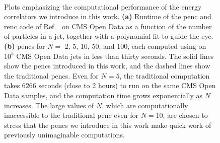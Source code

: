 \begin{figure}[t!]
    $\qquad$
    \caption[Plots emphasizing the computational performance of the new parameterization of energy correlators discussed in this work.]
    {
        Plots emphasizing the computational performance of the energy correlators we introduce in this work.
        \textbf{(a)}
        Runtime of the \gls{penc} and \gls{renc} code of Ref.~\cite{github:RENC} on CMS Open Data as a function of the number of particles in a jet, together with a polynomial fit to guide the eye.
        \textbf{(b)}
        \glspl{penc} for $N=$ 2, 5, 10, 50, and 100, each computed using on \(10^5\) CMS Open Data jets in less than thirty seconds.
        The solid lines show the \glspl{penc} introduced in this work, and the dashed lines show the traditional \glspl{penc}.
        Even for $N=5$, the traditional computation takes $6266$ seconds (close to 2 hours) to run on the same CMS Open Data samples, and the computation time grows exponentially as $N$ increases.
        The large values of $N$, which are computationally inaccessible to the traditional \gls{penc} even for $N=10$, are chosen to stress that the \glspl{penc} we introduce in this work make quick work of previously unimaginable computations.
    }
	\label{fig:runtime}%
\end{figure}




